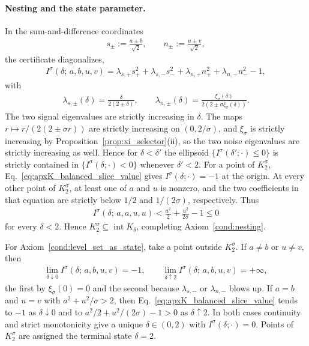 \documentclass{article}
\begin{document}
\paragraph{Nesting and the state parameter.}
In the sum-and-difference coordinates
\begin{align}
    s_\pm := \frac{a\pm b}{\sqrt 2}, \qquad
    n_\pm := \frac{u\pm v}{\sqrt 2},
\end{align}
the certificate diagonalizes,
\begin{align}
    I^\sigma(\delta;\,a,b,u,v)
    =
    \lambda_{s,+}s_+^2+\lambda_{s,-}s_-^2
    +\lambda_{n,+}n_+^2+\lambda_{n,-}n_-^2-1,
\end{align}
with
\begin{align}
    \lambda_{s,\pm}(\delta)
    =
    \frac{\delta}{2(2\pm\delta)},
    \qquad
    \lambda_{n,\pm}(\delta)
    =
    \frac{\xi_\sigma(\delta)}{2(2\pm\sigma\xi_\sigma(\delta))}.
\end{align}
The two signal eigenvalues are strictly increasing in $\delta$. The maps
$r\mapsto r/(2(2\pm\sigma r))$ are strictly increasing on $(0,2/\sigma)$, and
$\xi_\sigma$ is strictly increasing by
Proposition~\ref{prop:xi_selector}(ii), so the two noise eigenvalues are
strictly increasing as well. Hence for $\delta<\delta'$ the ellipsoid
$\{I^\sigma(\delta';\cdot)\le0\}$ is strictly contained in
$\{I^\sigma(\delta;\cdot)<0\}$ whenever $\delta'<2$.
For a point of $K_2^\sigma$, Eq.~\eqref{eq:apxK_balanced_slice_value} gives
$I^\sigma(\delta;\cdot)=-1$ at the origin. At every other point of
$K_2^\sigma$, at least one of $a$ and $u$ is nonzero, and the two coefficients
in that equation are strictly below $1/2$ and $1/(2\sigma)$, respectively.
Thus
\begin{align}
    I^\sigma(\delta;\,a,a,u,u)
    <
    \frac{a^2}{2}+\frac{u^2}{2\sigma}-1
    \le0
\end{align}
for every $\delta<2$. Hence $K_2^\sigma\subseteq
\operatorname{int}K_\delta$, completing Axiom~\ref{cond:nesting}.

For Axiom~\ref{cond:level_set_as_state}, take a point outside $K_2^\sigma$. If
$a\ne b$ or $u\ne v$, then
\begin{align}
    \lim_{\delta\downarrow 0} I^\sigma(\delta;\,a,b,u,v)=-1,
    \qquad
    \lim_{\delta\uparrow 2} I^\sigma(\delta;\,a,b,u,v)=+\infty,
\end{align}
the first by $\xi_\sigma(0)=0$ and the second because
$\lambda_{s,-}$ or $\lambda_{n,-}$ blows up. If $a=b$ and $u=v$ with
$a^2+u^2/\sigma>2$, then Eq.~\eqref{eq:apxK_balanced_slice_value} tends to
$-1$ as $\delta\downarrow0$ and to
$a^2/2+u^2/(2\sigma)-1>0$ as $\delta\uparrow2$. In both cases continuity and
strict monotonicity give a unique $\delta\in(0,2)$ with
$I^\sigma(\delta;\cdot)=0$. Points of $K_2^\sigma$ are assigned the terminal
state $\delta=2$.
\end{document}

